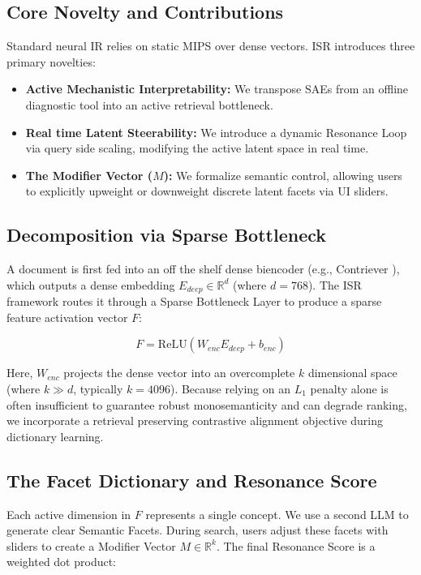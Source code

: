 \documentclass[sigconf,anonymous,screen]{acmart}
\begin{document}
\subsection{Core Novelty and Contributions}
\vspace{-2pt}
Standard neural IR relies on static MIPS over dense vectors. ISR introduces three primary novelties:
\begin{itemize}\setlength{\itemsep}{1pt}\setlength{\parskip}{0pt}\setlength{\topsep}{0pt}\setlength{\partopsep}{0pt}
    \item \textbf{Active Mechanistic Interpretability:} We transpose SAEs from an offline diagnostic tool into an active retrieval bottleneck.
    \item \textbf{Real time Latent Steerability:} We introduce a dynamic Resonance Loop via query side scaling, modifying the active latent space in real time.
    \item \textbf{The Modifier Vector ($M$):} We formalize semantic control, allowing users to explicitly upweight or downweight discrete latent facets via UI sliders.
\end{itemize}

\subsection{Decomposition via Sparse Bottleneck}
\vspace{-2pt}
A document is first fed into an off the shelf dense biencoder (e.g., Contriever \cite{izacard2022unsupervised}), which outputs a dense embedding $E_{deep} \in \mathbb{R}^d$ (where $d=768$). The ISR framework routes it through a Sparse Bottleneck Layer to produce a sparse feature activation vector $F$:

\begin{equation}
F = \text{ReLU}(W_{enc}E_{deep} + b_{enc})
\end{equation}

Here, $W_{enc}$ projects the dense vector into an overcomplete $k$ dimensional space (where $k \gg d$, typically $k=4096$). Because relying on an $L_1$ penalty alone is often insufficient to guarantee robust monosemanticity and can degrade ranking, we incorporate a retrieval preserving contrastive alignment objective during dictionary learning.

\subsection{The Facet Dictionary and Resonance Score}
\vspace{-2pt}
Each active dimension in $F$ represents a single concept. We use a second LLM to generate clear Semantic Facets. During search, users adjust these facets with sliders to create a Modifier Vector $M \in \mathbb{R}^k$. The final Resonance Score is a weighted dot product:
\end{document}
